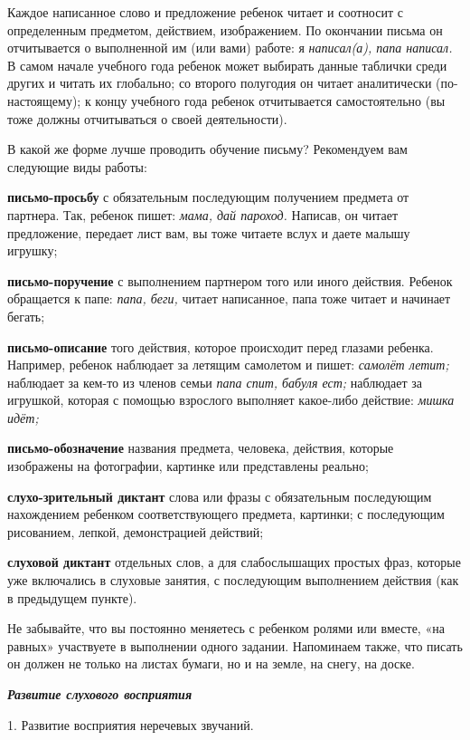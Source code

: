 \documentclass[a5paper]{book}
\renewcommand{\emph}[1]{\textit{#1}}
\begin{document}
Каждое написанное слово и предложение ребенок читает и соотносит с
определенным предметом, действием, изображением. По окончании письма он
отчитывается о выполненной им (или вами) работе: я \emph{написал(а),
папа написал.} В самом начале учебного года ребенок может выбирать
данные таблички среди других и читать их глобально\textsc{;} со второго
полугодия он читает аналитически (по-настоящему); к концу учебного года
ребенок отчитывается самостоятельно (вы тоже должны отчитываться о своей
деятельности).

В какой же форме лучше проводить обучение письму? Рекомендуем вам
следующие виды работы:

\textbf{письмо-просьбу} с обязательным последующим получением предмета
от партнера. Так, ребенок пишет: \emph{мама, дай пароход.} Написав, он
читает предложение, передает лист вам, вы тоже читаете вслух и даете
малышу игрушку;

\textbf{письмо-поручение} с выполнением партнером того или иного
действия. Ребенок обращается к папе: \emph{папа, беги,} читает
написанное, папа тоже читает и начинает бегать;

\textbf{письмо-описание} того действия, которое происходит перед глазами
ребенка. Например, ребенок наблюдает за летящим самолетом и пишет:
\emph{самолёт летит;} наблюдает за кем-то из членов семьи \emph{папа
спит, бабуля ест;} наблюдает за игрушкой, которая с помощью взрослого
выполняет какое-либо действие: \emph{мишка идёт;}

\textbf{письмо-обозначение} названия предмета, человека, действия,
которые изображены на фотографии, картинке или представлены реально;

\textbf{слухо-зрительный диктант} слова или фразы с обязательным
последующим нахождением ребенком соответствующего предмета, картинки; с
последующим рисованием, лепкой, демонстрацией действий;

\textbf{слуховой диктант} отдельных слов, а для слабослышащих простых
фраз, которые уже включались в слуховые занятия, с последующим
выполнением действия (как в предыдущем пункте).

Не забывайте, что вы постоянно меняетесь с ребенком ролями или вместе,
«на равных» участвуете в выполнении одного задании. Напоминаем также,
что писать он должен не только на листах бумаги, но и на земле, на
снегу, на доске.

\emph{\textbf{Развитие слухового восприятия}}

1. Развитие восприятия неречевых звучаний.
\end{document}
